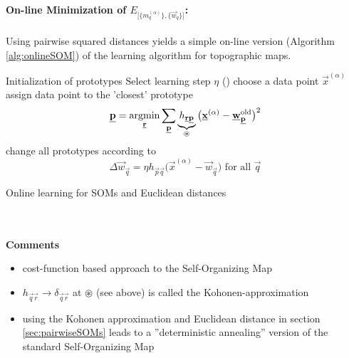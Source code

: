 \paragraph{On-line Minimization of $E_{ \big[ \big\{ m_q^{(\alpha)}
    \big\}, \big\{ \vec{w}_q \big\} \big] }$:}
Using pairwise squared distances yields a simple on-line version (Algorithm \ref{alg:onlineSOM}) of the learning algorithm for topographic maps. 
\begin{algorithm}
  \DontPrintSemicolon
Initialization of prototypes\;
Select learning step  $\eta$ \;
\Begin(){
choose a data point $\vec{x}^{(\alpha)}$\;
assign data point to the 'closest' prototype\;
\[ \vec{p} = \argmin_{\vec{r}} \sum\limits_{\vec{p}} 
	\underbrace{ h_{\vec{r} \vec{p}} }_{ \circledast }
	\big( \vec{x}^{(\alpha)} - \vec{w}_{\vec{p}}^{\mathrm{old}}
	\big)^2
\]
change all prototypes according to
\[ \Delta \vec{w}_{\vec{q}} = \eta h_{\vec{p} \vec{q}} \big( \vec{x}^{(\alpha)}
	-\vec{w}_{\vec{q}} \big) \text{ for all } \vec{q}
\]
}
\label{alg:onlineSOM}
\caption{Online learning for SOMs and Euclidean distances}
\end{algorithm}
\\\\
\textbf{Comments}
\begin{itemize}
  \item cost-function based approach to the Self-Organizing Map 
  \item $h_{\vec{q} \vec{r}} \rightarrow \delta_{\vec{q} \vec{r}}
  $ at $\circledast$ (see above) is called the Kohonen-approximation
  \item using the Kohonen approximation and Euclidean distance in
  section \ref{sec:pairwiseSOMs} leads to a ''deterministic
  annealing'' version of the standard Self-Organizing Map
\end{itemize}



\newpage
